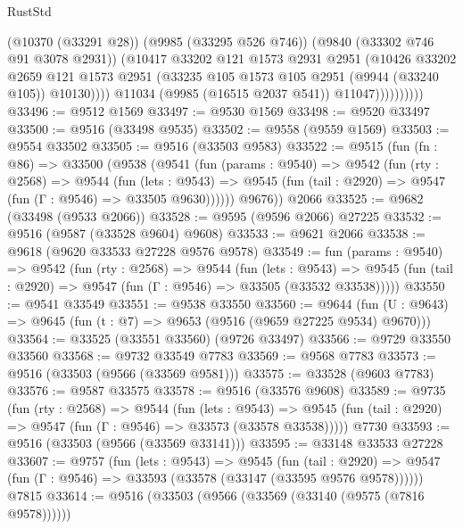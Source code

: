 \begin{lexlean}{RustStd}
\begin{coremodule}
                          (@10370 (@33291 @28))
                          (@9985 (@33295 @526 @746))
                          (@9840 (@33302 @746 @91 @3078 @2931))
                          (@10417
                            @33202
                            @121
                            @1573
                            @2931
                            @2951
                            (@10426
                              @33202
                              @2659
                              @121
                              @1573
                              @2951
                              (@33235 @105 @1573 @105 @2951 (@9944 (@33240 @105)) @10130))))
                        @11034
                        (@9985 (@16515 @2037 @541))
                        @11047))))))))))
@33496 := @9512 @1569
@33497 := @9530 @1569
@33498 := @9520 @33497
@33500 := @9516 (@33498 @9535)
@33502 := @9558 (@9559 @1569)
@33503 := @9554 @33502
@33505 := @9516 (@33503 @9583)
@33522 := @9515
    (fun (fn : @86) =>
    @33500
      (@9538
        (@9541
          (fun (params : @9540) =>
          @9542
            (fun (rty : @2568) =>
            @9544
              (fun (lets : @9543) =>
              @9545 (fun (tail : @2920) => @9547 (fun (Γ : @9546) => @33505 @9630))))))
        @9676))
    @2066
@33525 := @9682 (@33498 (@9533 @2066))
@33528 := @9595 (@9596 @2066) @27225
@33532 := @9516 (@9587 (@33528 @9604) @9608)
@33533 := @9621 @2066
@33538 := @9618 (@9620 @33533 @27228 @9576 @9578)
@33549 := fun (params : @9540) =>
  @9542
    (fun (rty : @2568) =>
    @9544
      (fun (lets : @9543) =>
      @9545 (fun (tail : @2920) => @9547 (fun (Γ : @9546) => @33505 (@33532 @33538)))))
@33550 := @9541 @33549
@33551 := @9538 @33550
@33560 := @9644
    (fun (U : @9643) => @9645 (fun (t : @7) => @9653 (@9516 (@9659 @27225 @9534) @9670)))
@33564 := @33525 (@33551 @33560) (@9726 @33497)
@33566 := @9729 @33550 @33560
@33568 := @9732 @33549 @7783
@33569 := @9568 @7783
@33573 := @9516 (@33503 (@9566 (@33569 @9581)))
@33575 := @33528 (@9603 @7783)
@33576 := @9587 @33575
@33578 := @9516 (@33576 @9608)
@33589 := @9735
    (fun (rty : @2568) =>
    @9544
      (fun (lets : @9543) =>
      @9545 (fun (tail : @2920) => @9547 (fun (Γ : @9546) => @33573 (@33578 @33538)))))
    @7730
@33593 := @9516 (@33503 (@9566 (@33569 @33141)))
@33595 := @33148 @33533 @27228
@33607 := @9757
    (fun (lets : @9543) =>
    @9545
      (fun (tail : @2920) =>
      @9547 (fun (Γ : @9546) => @33593 (@33578 (@33147 (@33595 @9576 @9578))))))
    @7815
@33614 := @9516 (@33503 (@9566 (@33569 (@33140 (@9575 (@7816 @9578))))))

\end{coremodule}
\end{lexlean}
